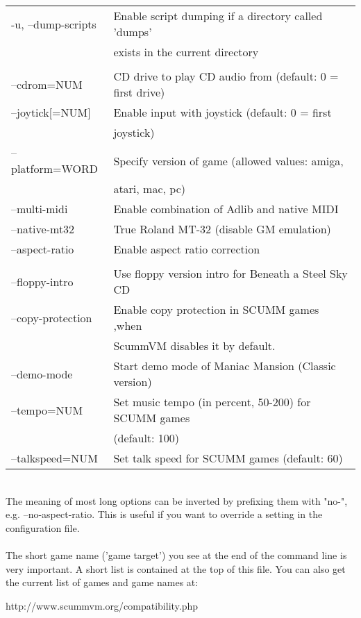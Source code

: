 \begin{tabular}{ll}
  -u, --dump-scripts      &Enable script dumping if a directory called 'dumps'\\
                          &exists in the current directory\\
\\
  --cdrom=NUM             &CD drive to play CD audio from (default: 0 = first drive)\\
  --joytick[=NUM]         &Enable input with joystick (default: 0 = first\\
                          &joystick)\\
  --platform=WORD         &Specify version of game (allowed values: amiga,\\
                          &atari, mac, pc)\\
  --multi-midi            &Enable combination of Adlib and native MIDI\\
  --native-mt32           &True Roland MT-32 (disable GM emulation)\\
  --aspect-ratio          &Enable aspect ratio correction\\
\\
  --floppy-intro          &Use floppy version intro for Beneath a Steel Sky CD\\
  --copy-protection       &Enable copy protection in SCUMM games ,when\\
                          &ScummVM disables it by default.\\
  --demo-mode             &Start demo mode of Maniac Mansion (Classic version)\\
  --tempo=NUM             &Set music tempo (in percent, 50-200) for SCUMM games\\
                          &(default: 100)\\
  --talkspeed=NUM         &Set talk speed for SCUMM games (default: 60)\\
\end{tabular}\\
The meaning of most long options can be inverted by prefixing them with "no-",
e.g. --no-aspect-ratio. This is useful if you want to override a setting in the
configuration file.\\
\quad \\
The short game name ('game target') you see at the end of the command
line is very important. A short list is contained at the top of this
file. You can also get the current list of games and game names at:

\begin{center}
  http://www.scummvm.org/compatibility.php
\end{center}

